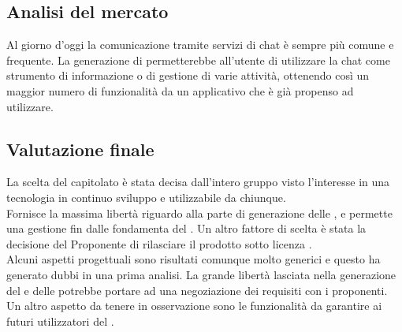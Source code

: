 \subsection{Analisi del mercato}
Al giorno d'oggi la comunicazione tramite servizi di chat è sempre più comune e frequente. La generazione di  permetterebbe all'utente di utilizzare la chat come strumento di informazione o di gestione di varie attività, ottenendo così un maggior numero di funzionalità da un applicativo che è già propenso ad utilizzare.

\subsection{Valutazione finale}
La scelta del capitolato è stata decisa dall'intero gruppo visto l'interesse in una tecnologia in continuo sviluppo e utilizzabile da chiunque.\\
Fornisce la massima libertà riguardo alla parte di generazione delle , e permette una gestione fin dalle fondamenta del . Un altro fattore di scelta è stata la decisione del Proponente di rilasciare il prodotto sotto licenza .\\
Alcuni aspetti progettuali sono risultati comunque molto generici e questo ha generato dubbi in una prima analisi. La grande libertà lasciata nella generazione del  e delle  potrebbe portare ad una negoziazione dei requisiti con i proponenti.\\
Un altro aspetto da tenere in osservazione sono le funzionalità da garantire ai futuri utilizzatori del .